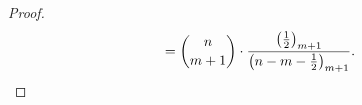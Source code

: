 \documentclass{mathincs}
\numberwithin{equation}{section}
\numberwithin{figure}{section}
\theoremstyle{plain}
\theoremstyle{definition}
\theoremstyle{remark}
\theoremstyle{plain}
\theoremstyle{definition}
\theoremstyle{plain}
\theoremstyle{plain}
\begin{document}
\begin{proof}
\begin{align*}
 = \binom{n}{m+1}\cdot\frac{\bigl(\frac12\bigr)_{m+1}}{\bigl(n-m-\frac12\bigr)_{m+1}}.  \qedhere
\end{align*}
\end{proof}
\end{document}
